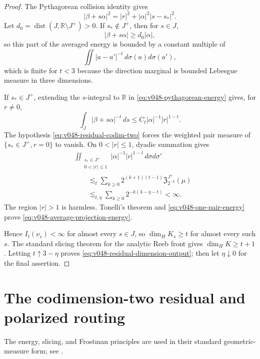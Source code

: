 \documentclass[10pt]{article}
\newcommand{\R}{\mathbb R}
\newcommand{\dist}{\operatorname{dist}}
\begin{document}
\begin{proof}
The Pythagorean collision identity gives
\begin{equation}
\label{eq:v048-pythagorean-energy}
|\beta+s\alpha|^2
=
|r|^2+|\alpha|^2|s-s_*|^2.
\end{equation}
Let \(d_0=\dist(J,\R\setminus J^+)>0\).  If \(s_*\notin J^+\), then for \(s\in J\),
\[
|\beta+s\alpha|
\ge
d_0|\alpha|,
\]
so this part of the averaged energy is bounded by a constant multiple of
\[
\iint|a-a'|^{-t}\,d\sigma(a)d\sigma(a'),
\]
which is finite for \(t<3\) because the direction marginal is bounded Lebesgue measure in
three dimensions.

If \(s_*\in J^+\), extending the \(s\)-integral to \(\R\) in
\eqref{eq:v048-pythagorean-energy} gives, for \(r\ne0\),
\begin{equation}
\label{eq:v048-one-pair-energy}
\int_J|\beta+s\alpha|^{-t}\,ds
\le
C_t|\alpha|^{-1}|r|^{1-t}.
\end{equation}
The hypothesis \eqref{eq:v048-residual-codim-two} forces the weighted pair measure of
\(\{s_*\in J^+,r=0\}\) to vanish.  On \(0<|r|\le1\), dyadic summation gives
\begin{align*}
&\iint_{\substack{s_*\in J^+\\0<|r|\le1}}
|\alpha|^{-1}|r|^{1-t}\,d\sigma d\sigma'
\\
&\qquad\lesssim_t
\sum_{k\ge0}
2^{(k+1)(t-1)}
\mathfrak Z_{2^{-k}}^{J^+}(\mu)
\\
&\qquad\lesssim_{t,\eta}
\sum_{k\ge0}
2^{-k(3-\eta-t)}
<\infty.
\end{align*}
The region \(|r|>1\) is harmless.  Tonelli's theorem and
\eqref{eq:v048-one-pair-energy} prove
\eqref{eq:v048-average-projection-energy}.

Hence \(I_t(\nu_s)<\infty\) for almost every \(s\in J\), so
\(\dim_HK_s\ge t\) for almost every such \(s\).  The standard slicing theorem for the analytic
Reeb front gives \(\dim_HK\ge t+1\).  Letting \(t\uparrow3-\eta\) proves
\eqref{eq:v048-residual-dimension-output}; then let \(\eta\downarrow0\) for the final assertion.
\end{proof}

\clearpage
\section{The codimension-two residual and polarized routing}
The energy, slicing, and Frostman principles are used in their standard geometric-measure form;
see \cite{Federer1969,Mattila1995}.
\end{document}
